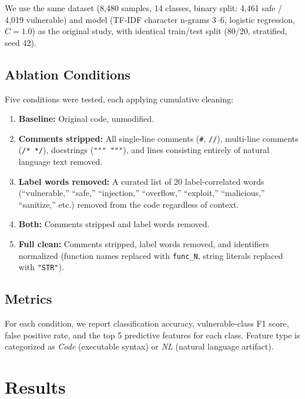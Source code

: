 \documentclass[11pt,a4paper]{article}
\begin{document}
We use the same dataset (8,480 samples, 14 classes, binary split: 4,461 safe / 4,019 vulnerable) and model (TF-IDF character n-grams 3--6, logistic regression, $C=1.0$) as the original study, with identical train/test split (80/20, stratified, seed 42).

\subsection{Ablation Conditions}

Five conditions were tested, each applying cumulative cleaning:

\begin{enumerate}
    \item \textbf{Baseline:} Original code, unmodified.
    \item \textbf{Comments stripped:} All single-line comments (\texttt{\#}, \texttt{//}), multi-line comments (\texttt{/* */}), docstrings (\texttt{""" """}), and lines consisting entirely of natural language text removed.
    \item \textbf{Label words removed:} A curated list of 20 label-correlated words (``vulnerable,'' ``safe,'' ``injection,'' ``overflow,'' ``exploit,'' ``malicious,'' ``sanitize,'' etc.) removed from the code regardless of context.
    \item \textbf{Both:} Comments stripped and label words removed.
    \item \textbf{Full clean:} Comments stripped, label words removed, and identifiers normalized (function names replaced with \texttt{func\_N}, string literals replaced with \texttt{"STR"}).
\end{enumerate}

\subsection{Metrics}

For each condition, we report classification accuracy, vulnerable-class F1 score, false positive rate, and the top 5 predictive features for each class. Feature type is categorized as \textit{Code} (executable syntax) or \textit{NL} (natural language artifact).

\section{Results}
\end{document}
